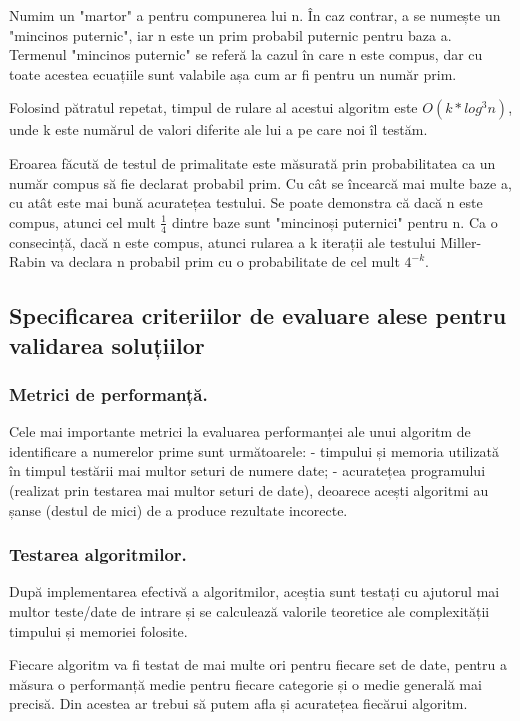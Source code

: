 \documentclass[runningheads]{llncs}
\begin{document}
Numim un "martor" a pentru compunerea lui n. În caz contrar, a se numește un "mincinos puternic", iar n este un prim probabil
puternic pentru baza a. Termenul "mincinos puternic" se referă la cazul în care n este compus, dar cu toate acestea ecuațiile
sunt valabile așa cum ar fi pentru un număr prim.

Folosind pătratul repetat, timpul de rulare al acestui algoritm este $O(k*log^{3}n)$, unde k este numărul de valori diferite ale lui a pe care noi îl testăm.

Eroarea făcută de testul de primalitate este măsurată prin probabilitatea ca un număr compus să fie declarat probabil
prim. Cu cât se încearcă mai multe baze a, cu atât este mai bună acuratețea testului. Se poate demonstra că dacă n este compus,
atunci cel mult $\frac{1}{4}$ dintre baze sunt "mincinoși puternici" pentru n. Ca o consecință, dacă n este compus, atunci
rularea a k iterații ale testului Miller-Rabin va declara n probabil prim cu o probabilitate de cel mult $4^{-k}$.

\subsection{Specificarea criteriilor de evaluare alese pentru validarea soluțiilor}

\subsubsection{Metrici de performanță.} Cele mai importante metrici la evaluarea performanței ale unui algoritm de identificare
a numerelor prime sunt următoarele: \newline
- timpului și memoria utilizată în timpul testării mai multor seturi de numere date; \newline
- acuratețea programului (realizat prin testarea mai multor seturi de date), deoarece acești algoritmi au șanse (destul de mici) de a produce rezultate incorecte.

\subsubsection{Testarea algoritmilor.}
După implementarea efectivă a algoritmilor, aceștia sunt testați cu ajutorul mai multor teste/date de intrare
și se calculează valorile teoretice ale complexității timpului și memoriei folosite.

Fiecare algoritm va fi testat de mai multe ori pentru fiecare set de date, pentru a măsura o performanță medie pentru fiecare
categorie și o medie generală mai precisă. Din acestea ar trebui să putem afla și acuratețea fiecărui algoritm.
\end{document}
